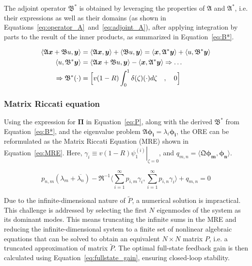 The adjoint operator $\mathfrak{B}^*$ is obtained by leveraging the properties of $\mathfrak{A}$ and $\mathfrak{A}^*$, i.e. their expressions as well as their domains (as shown in Equations~\ref{eq:operator_A}~and~\ref{eq:adjoint_A}), after applying integration by parts to the result of the inner products, as summarized in Equation~\ref{eq:B*}.

\begin{equation} \label{eq:B*}
    \begin{aligned}
        \langle \mathfrak{A} \bm{x} + \mathfrak{B} u, \bm{y} \rangle
        &= \langle \mathfrak{A} \bm{x}, \bm{y} \rangle
        + \langle \mathfrak{B} u, \bm{y} \rangle
        = \langle \bm{x}, \mathfrak{A}^* \bm{y}\rangle
        + \langle u, \mathfrak{B}^* \bm{y} \rangle \\
        \langle u, \mathfrak{B}^* \bm{y} \rangle
        &= \langle \mathfrak{A} \bm{x} + \mathfrak{B} u, \bm{y} \rangle
        - \langle \bm{x}, \mathfrak{A}^* \bm{y}\rangle
        \Rightarrow \hdots \\ \Rightarrow \mathfrak{B}^* (\cdot) &= \Bigl[ v(1-R) \int_0^1 \delta(\zeta) (\cdot) d\zeta \quad , \quad 0 \Bigr]
    \end{aligned}
\end{equation}

\subsubsection{Matrix Riccati equation}

Using the expression for $\mathbf{\Pi}$ in Equation~\ref{eq:P}, along with the derived $\mathfrak{B}^*$ from Equation~\ref{eq:B*}, and the eigenvalue problem $\mathfrak{A}\bm{\phi_i} = \lambda_i \bm{\phi_i}$, the ORE can be reformulated as the Matrix Riccati Equation (MRE) shown in Equation~\ref{eq:MRE}. Here, $\gamma_i \equiv v(1-R) \left. \psi_{1}^{(i)} \right|_{\zeta = 0}$, and $q_{m,n} = \langle \mathfrak{Q} \bm{\phi_m}, \bm{\phi_n} \rangle$.

\begin{equation}\label{eq:MRE}
    p_{n,m} (\lambda_m + \overline{\lambda_n})
    - \mathfrak{R}^{-1} \langle \sum_{i=1}^\infty p_{i,m} \gamma_i, \sum_{i=1}^\infty p_{i,n} \gamma_i \rangle
    + q_{m,n} = 0
\end{equation}

Due to the infinite-dimensional nature of $\tilde{P}$, a numerical solution is impractical. This challenge is addressed by selecting the first $N$ eigenmodes of the system as its dominant modes. This means truncating the infinite sums in the MRE and reducing the infinite-dimensional system to a finite set of nonlinear algebraic equations that can be solved to obtain an equivalent $N \times N$ matrix $P$, i.e. a truncated approximation of matrix $\tilde{P}$. The optimal full-state feedback gain is then calculated using Equation~\ref{eq:fullstate_gain}, ensuring closed-loop stability.

